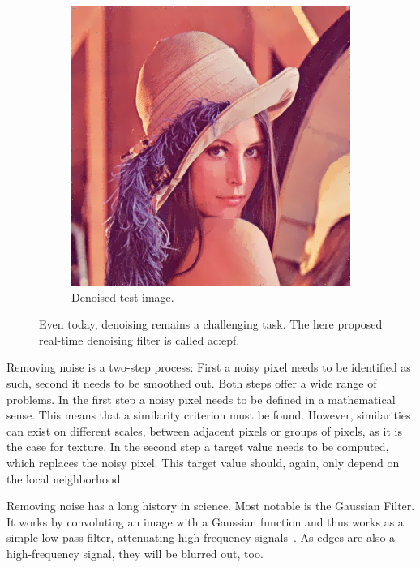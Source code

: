 \begin{figure}
\begin{subfigure}[]{0.475\textwidth}
        \includegraphics[width=\textwidth]{./figures/sensor/introduction_lena_edgefilter.jpg}
        \caption{Denoised test image.}
        \label{fig:sensor_introduction_lena_denoised}
	\end{subfigure}
  \caption{Even today, denoising remains a challenging task. The here proposed real-time denoising filter is called \gls{ac:epf}.}
  \label{fig:sensor_introduction_lena}
\end{figure}

Removing noise is a two-step process: First a noisy pixel needs to be identified as such, second it needs to be smoothed out. 
Both steps offer a wide range of problems.
In the first step a noisy pixel needs to be defined in a mathematical sense.
This means that a similarity criterion must be found.
However, similarities can exist on different scales, \ie between adjacent pixels or groups of pixels, as it is the case for texture.
In the second step a target value needs to be computed, which replaces the noisy pixel.
This target value should, again, only depend on the local neighborhood.

Removing noise has a long history in science. 
Most notable is the Gaussian Filter. 
It works by convoluting an image with a Gaussian function and thus works as a simple low-pass filter, attenuating high frequency signals~\cite[p. 257f]{gonzalezwoods2002}. 
As edges are also a high-frequency signal, they will be blurred out, too.

